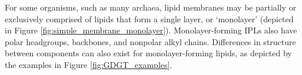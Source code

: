 For some organisms, such as many archaea, lipid membranes may be partially or exclusively comprised of lipids that form a single layer, or `monolayer' (depicted in Figure \ref{fig:simple_membrane_monolayer}).
Monolayer-forming IPLs also have polar headgroups, backbones, and nonpolar alkyl chains. Differences in structure between components can also exist for monolayer-forming lipids, as depicted by the examples in Figure \ref{fig:GDGT_examples}.

